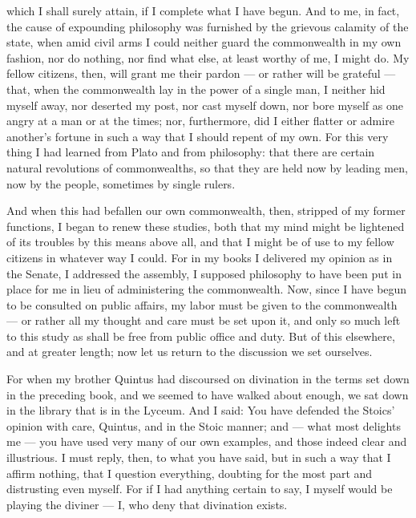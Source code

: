  which I shall surely attain, if I complete what I have begun. And to me, in fact, the cause of expounding philosophy was furnished by the grievous calamity of the state, when amid civil arms I could neither guard the commonwealth in my own fashion, nor do nothing, nor find what else, at least worthy of me, I might do. My fellow citizens, then, will grant me their pardon — or rather will be grateful — that, when the commonwealth lay in the power of a single man, I neither hid myself away, nor deserted my post, nor cast myself down, nor bore myself as one angry at a man or at the times; nor, furthermore, did I either flatter or admire another's fortune in such a way that I should repent of my own. For this very thing I had learned from Plato and from philosophy: that there are certain natural revolutions of commonwealths, so that they are held now by leading men, now by the people, sometimes by single rulers.

 And when this had befallen our own commonwealth, then, stripped of my former functions, I began to renew these studies, both that my mind might be lightened of its troubles by this means above all, and that I might be of use to my fellow citizens in whatever way I could. For in my books I delivered my opinion as in the Senate, I addressed the assembly, I supposed philosophy to have been put in place for me in lieu of administering the commonwealth. Now, since I have begun to be consulted on public affairs, my labor must be given to the commonwealth — or rather all my thought and care must be set upon it, and only so much left to this study as shall be free from public office and duty. But of this elsewhere, and at greater length; now let us return to the discussion we set ourselves.

 For when my brother Quintus had discoursed on divination in the terms set down in the preceding book, and we seemed to have walked about enough, we sat down in the library that is in the Lyceum. And I said: You have defended the Stoics' opinion with care, Quintus, and in the Stoic manner; and — what most delights me — you have used very many of our own examples, and those indeed clear and illustrious. I must reply, then, to what you have said, but in such a way that I affirm nothing, that I question everything, doubting for the most part and distrusting even myself. For if I had anything certain to say, I myself would be playing the diviner — I, who deny that divination exists.

